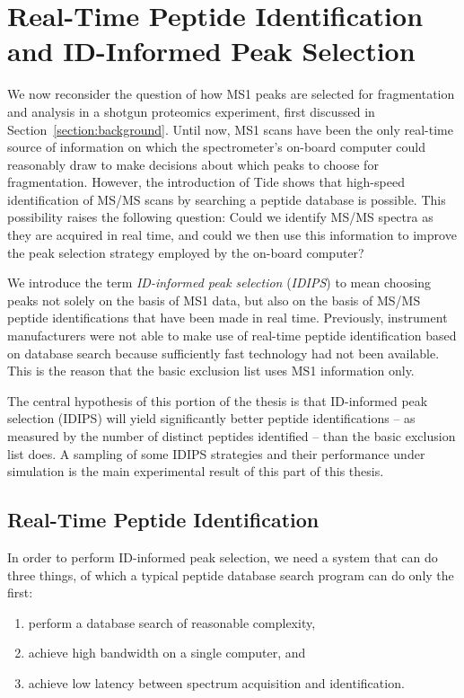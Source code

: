 \documentclass[12pt,twoside,openright]{report}
\begin{document}



\chapter{Real-Time Peptide Identification and ID-Informed Peak Selection}
\label{chapter:realtime}

We now reconsider the question of how MS1 peaks are selected for fragmentation
and analysis in a shotgun proteomics experiment, first discussed in
Section~\ref{section:background}. Until now, MS1 scans have been the only
real-time source of information on which the spectrometer's on-board computer
could reasonably draw to make decisions about which peaks to choose for
fragmentation. However, the introduction of Tide shows that high-speed
identification of MS/MS scans by searching a peptide database is possible. This
possibility raises the following question: Could we identify MS/MS spectra as
they are acquired in real time, and could we then use this information to
improve the peak selection strategy employed by the on-board computer?

We introduce the term {\it ID-informed peak selection} ({\it IDIPS}) to mean
choosing peaks not solely on the basis of MS1 data, but also on the basis of
MS/MS peptide identifications that have been made in real time. Previously,
instrument manufacturers were not able to make use of real-time peptide
identification based on database search because sufficiently fast technology had
not been available. This is the reason that the basic exclusion list uses MS1
information only.

The central hypothesis of this portion of the thesis is that ID-informed peak
selection (IDIPS) will yield significantly better peptide identifications -- as
measured by the number of distinct peptides identified -- than the basic
exclusion list does. A sampling of some IDIPS strategies and their performance
under simulation is the main experimental result of this part of this thesis.

\section{Real-Time Peptide Identification}
\label{section:lowlatency}

In order to perform ID-informed peak selection, we need a system that can do three
things, of which a typical peptide database search program can do only the
first:

\begin{enumerate}
\item perform a database search of reasonable complexity,
\item achieve high bandwidth on a single computer, and
\item achieve low latency between spectrum acquisition and identification.
\end{enumerate}
\end{document}

